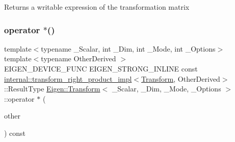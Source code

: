 \begin{DoxyReturn}{Returns}
a writable expression of the transformation matrix 
\end{DoxyReturn}
\mbox{\label{class_eigen_1_1_transform_ac23901d6db87bc853bc3e20eda4928e9}} 
\subsubsection{\texorpdfstring{operator $\ast$()}{operator *()}\hspace{0.1cm}{\footnotesize\ttfamily [1/4]}}
{\footnotesize\ttfamily template$<$typename \+\_\+\+Scalar, int \+\_\+\+Dim, int \+\_\+\+Mode, int \+\_\+\+Options$>$ \\
template$<$typename Other\+Derived $>$ \\
E\+I\+G\+E\+N\+\_\+\+D\+E\+V\+I\+C\+E\+\_\+\+F\+U\+NC E\+I\+G\+E\+N\+\_\+\+S\+T\+R\+O\+N\+G\+\_\+\+I\+N\+L\+I\+NE const \mbox{\hyperlink{struct_eigen_1_1internal_1_1transform__right__product__impl}{internal\+::transform\+\_\+right\+\_\+product\+\_\+impl}}$<$\mbox{\hyperlink{class_eigen_1_1_transform}{Transform}}, Other\+Derived$>$\+::Result\+Type \mbox{\hyperlink{class_eigen_1_1_transform}{Eigen\+::\+Transform}}$<$ \+\_\+\+Scalar, \+\_\+\+Dim, \+\_\+\+Mode, \+\_\+\+Options $>$\+::operator $\ast$ (\begin{DoxyParamCaption}\item[{const \mbox{\hyperlink{struct_eigen_1_1_eigen_base}{Eigen\+Base}}$<$ Other\+Derived $>$ \&}]{other }\end{DoxyParamCaption}) const\hspace{0.3cm}{\ttfamily [inline]}}

